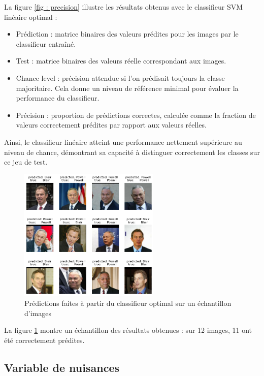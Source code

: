 \documentclass[a4paper,12pt]{article}
\begin{document}
La figure \ref{fig : precision} illustre les résultats obtenus avec le classifieur SVM linéaire optimal : 
\begin{itemize}
    \item Prédiction : matrice binaires des valeurs prédites pour les images par le classifieur entraîné.
    \item Test : matrice binaires des valeurs réelle correspondant aux images.
    \item Chance level : précision attendue si l’on prédisait toujours la classe majoritaire. Cela donne un niveau de référence minimal pour évaluer la performance du classifieur.
    \item Précision : proportion de prédictions correctes, calculée comme la fraction de valeurs correctement prédites par rapport aux valeurs réelles.
\end{itemize}

Ainsi, le classifieur linéaire atteint une performance nettement supérieure au niveau de chance, démontrant sa capacité à distinguer correctement les classes sur ce jeu de test.

\begin{figure}[H]
    \centering
    \includegraphics[width=0.6\textwidth]{Images/prediction_visage.png}
    \caption{Prédictions faites à partir du classifieur optimal sur un échantillon d'images}\label{fig:predict}
\end{figure}

La figure \ref{fig:predict} montre un échantillon des résultats obtenues : sur 12 images, 11 ont été correctement prédites.

\subsection{Variable de nuisances}
\end{document}
